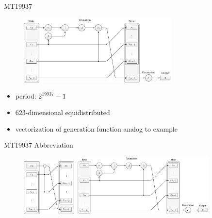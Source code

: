 \documentclass[aspectratio=169]{beamer}
\begin{document}
    \begin{frame}{MT19937}
      \begin{figure}
        \includegraphics[width=0.72\textwidth]{figures/mt19937_scheme.pdf}
      \end{figure}
      \begin{itemize}
        \item period: $2^{19937}-1$
        \pause
        \item 623-dimensional equidistributed
        \pause
        \item vectorization of generation function analog to example
      \end{itemize}
    \end{frame}

    \begin{frame}{MT19937 Abbreviation}
      \begin{figure}
        \includegraphics[width=0.25\textwidth]{figures/mt19937_transition_short.pdf}
        \hfill
        \includegraphics[width=0.637\textwidth]{figures/mt19937_scheme.pdf}
      \end{figure}
    \end{frame}
\end{document}
